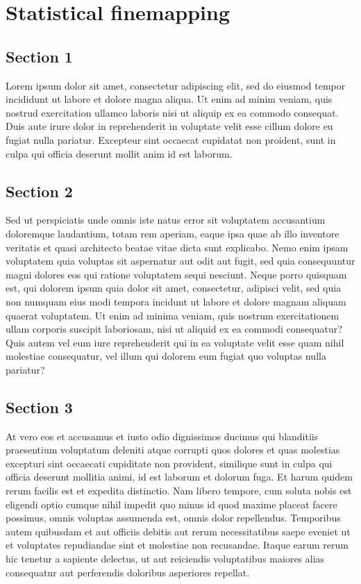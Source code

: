 \documentclass[
]{book}
\begin{document}
\hypertarget{statistical-finemapping}{%
\chapter{Statistical finemapping}\label{statistical-finemapping}}

\hypertarget{section-1-4}{%
\section{Section 1}\label{section-1-4}}

Lorem ipsum dolor sit amet, consectetur adipiscing elit, sed do eiusmod tempor incididunt ut labore et dolore magna aliqua. Ut enim ad minim veniam, quis nostrud exercitation ullamco laboris nisi ut aliquip ex ea commodo consequat. Duis aute irure dolor in reprehenderit in voluptate velit esse cillum dolore eu fugiat nulla pariatur. Excepteur sint occaecat cupidatat non proident, sunt in culpa qui officia deserunt mollit anim id est laborum.

\hypertarget{section-2-4}{%
\section{Section 2}\label{section-2-4}}

Sed ut perspiciatis unde omnis iste natus error sit voluptatem accusantium doloremque laudantium, totam rem aperiam, eaque ipsa quae ab illo inventore veritatis et quasi architecto beatae vitae dicta sunt explicabo. Nemo enim ipsam voluptatem quia voluptas sit aspernatur aut odit aut fugit, sed quia consequuntur magni dolores eos qui ratione voluptatem sequi nesciunt. Neque porro quisquam est, qui dolorem ipsum quia dolor sit amet, consectetur, adipisci velit, sed quia non numquam eius modi tempora incidunt ut labore et dolore magnam aliquam quaerat voluptatem. Ut enim ad minima veniam, quis nostrum exercitationem ullam corporis suscipit laboriosam, nisi ut aliquid ex ea commodi consequatur? Quis autem vel eum iure reprehenderit qui in ea voluptate velit esse quam nihil molestiae consequatur, vel illum qui dolorem eum fugiat quo voluptas nulla pariatur?

\hypertarget{section-3-4}{%
\section{Section 3}\label{section-3-4}}

At vero eos et accusamus et iusto odio dignissimos ducimus qui blanditiis praesentium voluptatum deleniti atque corrupti quos dolores et quas molestias excepturi sint occaecati cupiditate non provident, similique sunt in culpa qui officia deserunt mollitia animi, id est laborum et dolorum fuga. Et harum quidem rerum facilis est et expedita distinctio. Nam libero tempore, cum soluta nobis est eligendi optio cumque nihil impedit quo minus id quod maxime placeat facere possimus, omnis voluptas assumenda est, omnis dolor repellendus. Temporibus autem quibusdam et aut officiis debitis aut rerum necessitatibus saepe eveniet ut et voluptates repudiandae sint et molestiae non recusandae. Itaque earum rerum hic tenetur a sapiente delectus, ut aut reiciendis voluptatibus maiores alias consequatur aut perferendis doloribus asperiores repellat.
\end{document}
